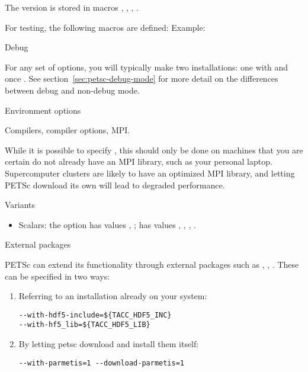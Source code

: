The version is stored in macros
,
,
,
.

For testing, the following macros are defined:
Example:

 {Debug}

For any set of options, you will typically make two installations:
one with  and once .
See section~\ref{sec:petsc-debug-mode} for more detail
on the differences between debug and non-debug mode.

 {Environment options}

Compilers, compiler options, MPI.

While it is possible to specify ,
this should only be done on machines that you are certain do not
already have an MPI library, such as your personal
laptop. Supercomputer clusters are likely to have an optimized MPI
library, and letting PETSc download its own will lead to degraded
performance.

 {Variants}

\begin{itemize}
\item Scalars: the option  has values
  , ;  has values
  , , , .
\end{itemize}

 {External packages}
\label{sec:petsc-external}

PETSc can extend its functionality through external packages such as
, , . These can be
specified in two ways:
\begin{enumerate}
\item Referring to an installation already on your system:
\begin{verbatim}
--with-hdf5-include=${TACC_HDF5_INC}
--with-hf5_lib=${TACC_HDF5_LIB}
\end{verbatim}
\item By letting petsc download and install them itself:
\begin{verbatim}
--with-parmetis=1 --download-parmetis=1
\end{verbatim}
\end{enumerate}

